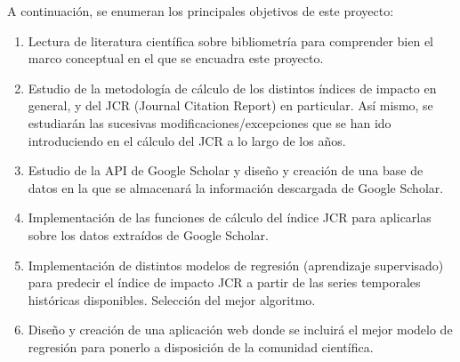 
A continuación, se enumeran los principales objetivos de este proyecto:

\begin{enumerate}
\item Lectura de literatura científica sobre bibliometría para comprender bien el marco conceptual en el que se encuadra este proyecto.
\item Estudio de la metodología de cálculo de los distintos índices de impacto en general, y del JCR (Journal Citation Report) en particular. Así mismo, se estudiarán las sucesivas modificaciones/excepciones que se han ido introduciendo en el cálculo del JCR a lo largo de los años.
\item Estudio de la API de Google Scholar y diseño y creación de una base de datos en la que se almacenará la información descargada de Google Scholar.
\item Implementación de las funciones de cálculo del índice JCR para aplicarlas sobre los datos extraídos de Google Scholar. 
\item Implementación de distintos modelos de regresión (aprendizaje supervisado) para predecir el índice de impacto JCR a partir de las series temporales históricas disponibles. Selección del mejor algoritmo.
\item Diseño y creación de una aplicación web donde se incluirá el mejor modelo de regresión para ponerlo a disposición de la comunidad científica.
\end{enumerate}